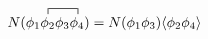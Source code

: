 \documentclass[10pt]{article}
\begin{document}
\begin{align*}
N(
\contraction[1ex]{\phi_1}{\phi_2}{\phi_3}{\phi_4}
\phi_1 \phi_2 \phi_3 \phi_4
)
= 
N(\phi_1 \phi_3) \langle \phi_2 \phi_4 \rangle
\end{align*}
\end{document}
